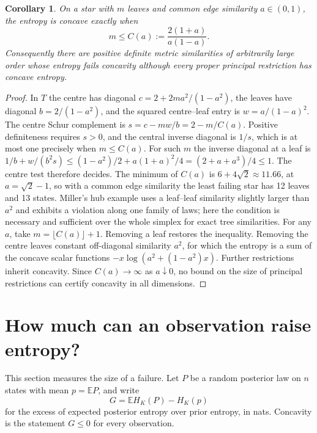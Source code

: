 \documentclass[11pt,a4paper]{article}
\newtheorem{corollary}[theorem]{Corollary}
\theoremstyle{remark}
\begin{document}
\begin{corollary}\label{cor:star}
On a star with $m$ leaves and common edge similarity $a\in(0,1)$, the entropy is concave exactly when
\[
                 m\le C(a):=\frac{2(1+a)}{a(1-a)}.
\]
Consequently there are positive definite metric similarities of arbitrarily large order whose entropy fails concavity although every proper principal restriction has concave entropy.
\end{corollary}
\begin{proof}
In $T$ the centre has diagonal $c=2+2ma^2/(1-a^2)$, the leaves have diagonal $b=2/(1-a^2)$, and the squared centre--leaf entry is $w=a/(1-a)^2$. The centre Schur complement is $s=c-mw/b=2-m/C(a)$. Positive definiteness requires $s>0$, and the central inverse diagonal is $1/s$, which is at most one precisely when $m\le C(a)$. For such $m$ the inverse diagonal at a leaf is $1/b+w/(b^2s)\le (1-a^2)/2+a(1+a)^2/4=(2+a+a^3)/4\le1$. The centre test therefore decides.
The minimum of $C(a)$ is $6+4\sqrt2\approx11.66$, at $a=\sqrt2-1$, so with a common edge similarity the least failing star has 12 leaves and 13 states. Miller's hub example \cite[Appendix E]{miller} uses a leaf--leaf similarity slightly larger than $a^2$ and exhibits a violation along one family of laws; here the condition is necessary and sufficient over the whole simplex for exact tree similarities.
For any $a$, take $m=\lfloor C(a)\rfloor+1$. Removing a leaf restores the inequality. Removing the centre leaves constant off-diagonal similarity $a^2$, for which the entropy is a sum of the concave scalar functions $-x\log(a^2+(1-a^2)x)$. Further restrictions inherit concavity. Since $C(a)\to\infty$ as $a\downarrow0$, no bound on the size of principal restrictions can certify concavity in all dimensions.
\end{proof}

\section{How much can an observation raise entropy?}\label{sec:mixing}
This section measures the size of a failure. Let $P$ be a random posterior law on $n$ states with mean $p=\mathbb{E}P$, and write
\[
 G=\mathbb{E}H_K(P)-H_K(p)
\]
for the excess of expected posterior entropy over prior entropy, in nats. Concavity is the statement $G\le0$ for every observation.
\end{document}
